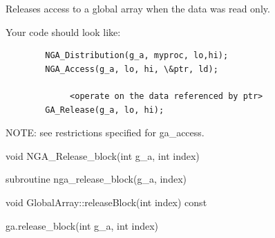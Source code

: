 \documentclass[12pt]{article}
\begin{document}
\local

\begin{desc}

Releases access to a global array when the data was read only.

Your code should look like:
\begin{verbatim}
        NGA_Distribution(g_a, myproc, lo,hi);
        NGA_Access(g_a, lo, hi, \&ptr, ld);

             <operate on the data referenced by ptr>
        GA_Release(g_a, lo, hi);
\end{verbatim}
NOTE: see restrictions specified for ga_access.

\end{desc}



\begin{capi}
\begin{ccode}
void NGA_Release_block(int g_a, int index)
\end{ccode}
\begin{funcargs}
\end{funcargs}
\end{capi}

\begin{fapi}
\begin{fcode}
subroutine nga_release_block(g_a, index)
\end{fcode}
\begin{funcargs}
\end{funcargs}
\end{fapi}

\begin{cxxapi}
\begin{cxxcode}
void GlobalArray::releaseBlock(int index) const
\end{cxxcode}
\begin{funcargs}
\end{funcargs}
\end{cxxapi}

\begin{pyapi}
\begin{pycode}
ga.release_block(int g_a, int index)
\end{pycode}
\begin{funcargs}
\end{funcargs}
\end{pyapi}
\end{document}
